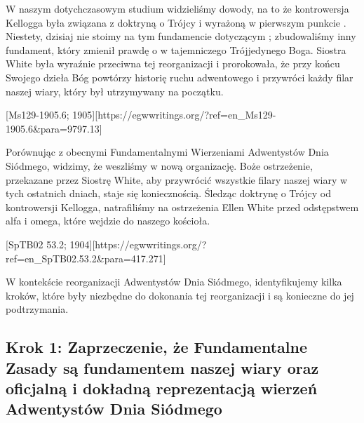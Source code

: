 
W naszym dotychczasowym studium widzieliśmy dowody, na to że kontrowersja Kellogga była związana z doktryną o Trójcy i  wyrażoną w pierwszym punkcie . Niestety, dzisiaj nie stoimy na tym fundamencie dotyczącym ; zbudowaliśmy inny fundament, który zmienił prawdę o  w tajemniczego Trójjedynego Boga. Siostra White była wyraźnie przeciwna tej reorganizacji i prorokowała, że przy końcu Swojego dzieła Bóg powtórzy historię ruchu adwentowego i przywróci każdy filar naszej wiary, który był utrzymywany na początku.

[Ms129-1905.6; 1905][https://egwwritings.org/?ref=en\_Ms129-1905.6&para=9797.13]

Porównując  z obecnymi Fundamentalnymi Wierzeniami Adwentystów Dnia Siódmego, widzimy, że weszliśmy w nową organizację. Boże ostrzeżenie, przekazane przez Siostrę White, aby przywrócić wszystkie filary naszej wiary w tych ostatnich dniach, staje się koniecznością. Śledząc doktrynę o Trójcy od kontrowersji Kellogga, natrafiliśmy na ostrzeżenia Ellen White przed odstępstwem alfa i omega, które wejdzie do naszego kościoła.

[SpTB02 53.2; 1904][https://egwwritings.org/?ref=en\_SpTB02.53.2&para=417.271]

W kontekście reorganizacji Adwentystów Dnia Siódmego, identyfikujemy kilka kroków, które były niezbędne do dokonania tej reorganizacji i są konieczne do jej podtrzymania.

\subsection*{Krok 1: Zaprzeczenie, że Fundamentalne Zasady są fundamentem naszej wiary oraz oficjalną i dokładną reprezentacją wierzeń Adwentystów Dnia Siódmego}

